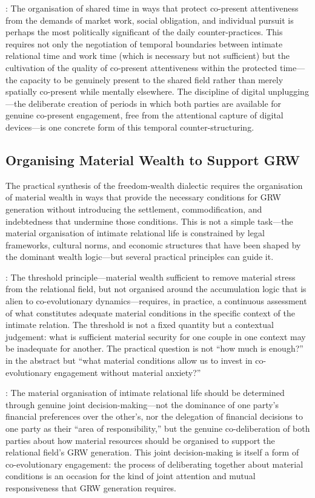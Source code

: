 : The organisation of shared time in ways that protect co-present attentiveness from the demands of market work, social obligation, and individual pursuit is perhaps the most politically significant of the daily counter-practices. This requires not only the negotiation of temporal boundaries between intimate relational time and work time (which is necessary but not sufficient) but the cultivation of the quality of co-present attentiveness within the protected time---the capacity to be genuinely present to the shared field rather than merely spatially co-present while mentally elsewhere. The discipline of digital unplugging---the deliberate creation of periods in which both parties are available for genuine co-present engagement, free from the attentional capture of digital devices---is one concrete form of this temporal counter-structuring.

\subsection{Organising Material Wealth to Support GRW}
\label{p15:subsec:organising_material}

\noindent
The practical synthesis of the freedom-wealth dialectic requires the organisation of material wealth in ways that provide the necessary conditions for GRW generation without introducing the settlement, commodification, and indebtedness that undermine those conditions. This is not a simple task---the material organisation of intimate relational life is constrained by legal frameworks, cultural norms, and economic structures that have been shaped by the dominant wealth logic---but several practical principles can guide it.

: The threshold principle---material wealth sufficient to remove material stress from the relational field, but not organised around the accumulation logic that is alien to co-evolutionary dynamics---requires, in practice, a continuous assessment of what constitutes adequate material conditions in the specific context of the intimate relation. The threshold is not a fixed quantity but a contextual judgement: what is sufficient material security for one couple in one context may be inadequate for another. The practical question is not ``how much is enough?'' in the abstract but ``what material conditions allow us to invest in co-evolutionary engagement without material anxiety?''

: The material organisation of intimate relational life should be determined through genuine joint decision-making---not the dominance of one party's financial preferences over the other's, nor the delegation of financial decisions to one party as their ``area of responsibility,'' but the genuine co-deliberation of both parties about how material resources should be organised to support the relational field's GRW generation. This joint decision-making is itself a form of co-evolutionary engagement: the process of deliberating together about material conditions is an occasion for the kind of joint attention and mutual responsiveness that GRW generation requires.

